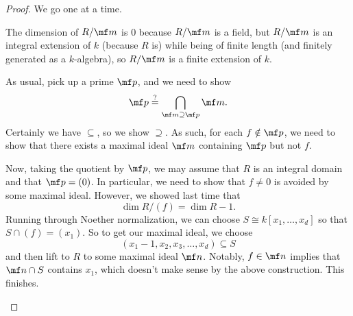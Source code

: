 \begin{proof}
	We go one at a time.
	\begin{listalph}
		\item The dimension of $R/\mf m$ is $0$ because $R/\mf m$ is a field, but $R/\mf m$ is an integral extension of $k$ (because $R$ is) while being of finite length (and finitely generated as a $k$-algebra), so $R/\mf m$ is a finite extension of $k$.
		\item As usual, pick up a prime $\mf p$, and we need to show
		\[\mf p\stackrel?=\bigcap_{\mf m\supseteq\mf p}\mf m.\]
		Certainly we have $\subseteq$, so we show $\supseteq$. As such, for each $f\notin\mf p$, we need to show that there exists a maximal ideal $\mf m$ containing $\mf p$ but not $f$.

		Now, taking the quotient by $\mf p$, we may assume that $R$ is an integral domain and that $\mf p=(0)$. In particular, we need to show that $f\ne0$ is avoided by some maximal ideal. However, we showed last time that
		\[\dim R/(f)=\dim R-1.\]
		Running through Noether normalization, we can choose $S\cong k[x_1,\ldots,x_d]$ so that $S\cap(f)=(x_1)$. So to get our maximal ideal, we choose
		\[(x_1-1,x_2,x_3,\ldots,x_d)\subseteq S\]
		and then lift to $R$ to some maximal ideal $\mf n$. Notably, $f\in\mf n$ implies that $\mf n\cap S$ contains $x_1$, which doesn't make sense by the above construction. This finishes.
		\qedhere
	\end{listalph}
\end{proof}

